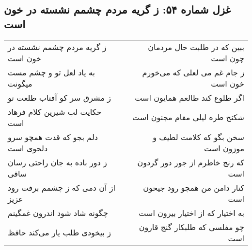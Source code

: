 \begin{center}
\section*{غزل شماره ۵۴: ز گریه مردم چشمم نشسته در خون است}
\label{sec:sh054}
\begin{longtable}{l p{0.5cm} r}
ز گریه مردم چشمم نشسته در خون است
&&
ببین که در طلبت حال مردمان چون است
\\
به یاد لعل تو و چشم مست میگونت
&&
ز جام غم می لعلی که می‌خورم خون است
\\
ز مشرق سر کو آفتاب طلعت تو
&&
اگر طلوع کند طالعم همایون است
\\
حکایت لب شیرین کلام فرهاد است
&&
شکنج طره لیلی مقام مجنون است
\\
دلم بجو که قدت همچو سرو دلجوی است
&&
سخن بگو که کلامت لطیف و موزون است
\\
ز دور باده به جان راحتی رسان ساقی
&&
که رنج خاطرم از جور دور گردون است
\\
از آن دمی که ز چشمم برفت رود عزیز
&&
کنار دامن من همچو رود جیحون است
\\
چگونه شاد شود اندرون غمگینم
&&
به اختیار که از اختیار بیرون است
\\
ز بیخودی طلب یار می‌کند حافظ
&&
چو مفلسی که طلبکار گنج قارون است
\\
\end{longtable}
\end{center}
